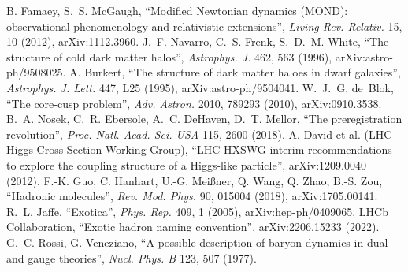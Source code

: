 B. Famaey, S.~S. McGaugh, ``Modified Newtonian dynamics (MOND): observational phenomenology and relativistic
extensions'', \emph{Living Rev. Relativ.} 15, 10 (2012), arXiv:1112.3960.
 J.~F. Navarro, C.~S. Frenk, S.~D.~M. White, ``The structure of cold dark matter halos'', \emph{Astrophys. J.} 462,
563 (1996), arXiv:astro-ph/9508025.
 A. Burkert, ``The structure of dark matter haloes in dwarf galaxies'', \emph{Astrophys. J. Lett.} 447, L25 (1995),
arXiv:astro-ph/9504041.
 W.~J.~G. de~Blok, ``The core-cusp problem'', \emph{Adv. Astron.} 2010, 789293 (2010), arXiv:0910.3538.
 B.~A. Nosek, C.~R. Ebersole, A.~C. DeHaven, D.~T. Mellor, ``The preregistration revolution'', \emph{Proc. Natl.
Acad. Sci. USA} 115, 2600 (2018).
 A. David et al. (LHC Higgs Cross Section Working Group), ``LHC HXSWG interim recommendations to explore the coupling
structure of a Higgs-like particle'', arXiv:1209.0040 (2012).
 F.-K. Guo, C. Hanhart, U.-G. Mei\ss{}ner, Q. Wang, Q. Zhao, B.-S. Zou, ``Hadronic molecules'', \emph{Rev. Mod. Phys.}
90, 015004 (2018), arXiv:1705.00141.
 R.~L. Jaffe, ``Exotica'', \emph{Phys. Rep.} 409, 1 (2005), arXiv:hep-ph/0409065.
 LHCb Collaboration, ``Exotic hadron naming convention'', arXiv:2206.15233 (2022).
 G.~C. Rossi, G. Veneziano, ``A possible description of baryon dynamics in dual and gauge theories'',
\emph{Nucl. Phys. B} 123, 507 (1977).
